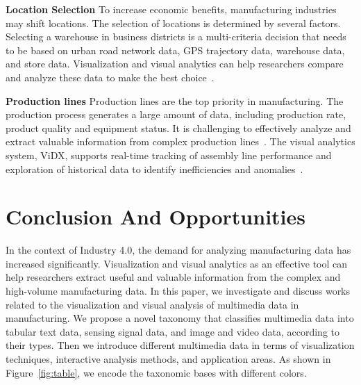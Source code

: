\documentclass[a4paper,fleqn]{cas-dc}
\begin{document}
\textbf{Location Selection} To increase economic benefits, manufacturing industries may shift locations. The selection of locations is determined by several factors. Selecting a warehouse in business districts is a multi-criteria decision that needs to be based on urban road network data, GPS
trajectory data, warehouse data, and store data. Visualization and visual analytics can help researchers compare and analyze these data to make the best choice~\cite{Li2020}.

\textbf{Production lines} Production lines are the top priority in manufacturing. The production process generates a large amount of data, including production rate, product quality and equipment status. It is challenging to effectively analyze and extract valuable information from complex production lines~\cite{wu2018visual}. The visual analytics system, ViDX, supports real-time tracking of assembly line performance and exploration of historical data to identify inefficiencies and anomalies~\cite{xu2016vidx}.

\section{Conclusion And Opportunities}
In the context of Industry 4.0, the demand for analyzing manufacturing data has increased significantly. Visualization and visual analytics as an effective tool can help researchers extract useful and valuable information from the complex and high-volume manufacturing data. In this paper, we investigate and discuss works related to the visualization and visual analysis of multimedia data in manufacturing. We propose a novel taxonomy that classifies multimedia
data into tabular text data, sensing signal data, and image and video data, according to their types. Then we introduce different multimedia data in terms of visualization techniques, interactive analysis methods, and application areas. As shown in Figure~\ref{fig:table}, we encode the taxonomic bases with different colors.



\end{document}
